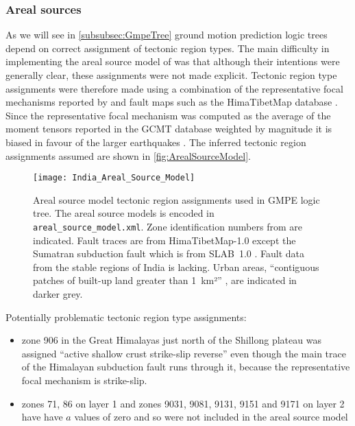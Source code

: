 \documentclass{article}
\begin{document}
\cite{thingbaijam2011seismogenic}

\subsubsection{Areal sources}
\label{sec:Areal}

As we will see in \autoref{subsubsec:GmpeTree} ground motion prediction logic trees depend on correct assignment of tectonic region types. The main difficulty in implementing the areal source model of  \cite{nath2012probabilistic} was that although their intentions were generally clear, these assignments were not made explicit. Tectonic region type assignments were therefore made using a combination of the representative focal mechanisms reported by \cite{nath2012probabilistic} and fault maps such as the HimaTibetMap database \citep{styron2010database}. Since the representative focal mechanism was computed as the average of the moment tensors reported in the GCMT database weighted by magnitude it is biased in favour of the larger earthquakes \citep{thingbaijam2011seismogenic}. The inferred tectonic region assignments assumed are shown in \autoref{fig:ArealSourceModel}.

\begin{figure}[!htb]
\begin{adjustbox}{center}
\texttt{[image: India\_Areal\_Source\_Model]}
\end{adjustbox}
\caption[Areal source model]{Areal source model tectonic region assignments used in GMPE logic tree. The areal source models is encoded in \texttt{areal\_source\_model.xml}. Zone identification numbers from \cite{nath2012probabilistic} are indicated. Fault traces are from HimaTibetMap-1.0 \citep{styron2010database} except the Sumatran subduction fault which is from SLAB~1.0 \citep{hayes2012slab1}. Fault data from the stable regions of India is lacking. Urban areas, ``contiguous patches of built-up land greater than 1~km²'' \citep{schneider2009new}, are indicated in darker grey.}
\label{fig:ArealSourceModel}
\end{figure}

Potentially problematic tectonic region type assignments:
\begin{itemize}
\item zone 906 in the Great Himalayas just north of the Shillong plateau was assigned ``active shallow crust strike-slip reverse'' even though the main trace of the Himalayan subduction fault runs through it, because the representative focal mechanism is strike-slip. 
\item zones 71, 86 on layer 1 and zones 9031, 9081, 9131, 9151 and 9171 on layer 2 have have $a$ values of zero and so were not included in the areal source model
\end{itemize}
\end{document}
